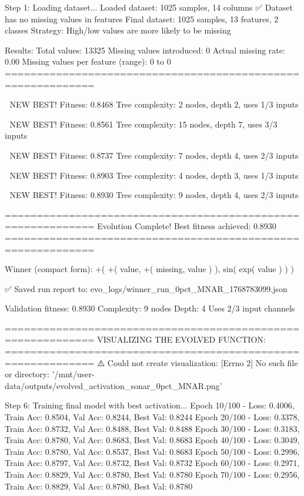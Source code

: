 Step 1: Loading dataset...
Loaded dataset: 1025 samples, 14 columns
✅ Dataset has no missing values in features
Final dataset: 1025 samples, 13 features, 2 classes
Strategy: High/low values are more likely to be missing

Results:
  Total values: 13325
  Missing values introduced: 0
  Actual missing rate: 0.00%
  Missing values per feature (range): 0 to 0
============================================================


🎯 NEW BEST! Fitness: 0.8468
Tree complexity: 2 nodes, depth 2, uses 1/3 inputs

🎯 NEW BEST! Fitness: 0.8561
Tree complexity: 15 nodes, depth 7, uses 3/3 inputs

🎯 NEW BEST! Fitness: 0.8737
Tree complexity: 7 nodes, depth 4, uses 2/3 inputs

🎯 NEW BEST! Fitness: 0.8903
Tree complexity: 4 nodes, depth 3, uses 1/3 inputs

🎯 NEW BEST! Fitness: 0.8930
Tree complexity: 9 nodes, depth 4, uses 2/3 inputs

============================================================
Evolution Complete!
Best fitness achieved: 0.8930
============================================================

Winner (compact form):
 +(
  +(
    value,
    +(
      missing,
      value
    )
  ),
  sin(
    exp(
      value
    )
  )
)

✅ Saved run report to: evo_logs/winner_run_0pct_MNAR_1768783099.json

Validation fitness: 0.8930
Complexity: 9 nodes
Depth: 4
Uses 2/3 input channels

============================================================
VISUALIZING THE EVOLVED FUNCTION:
============================================================
⚠️ Could not create visualization: [Errno 2] No such file or directory: '/mnt/user-data/outputs/evolved_activation_sonar_0pct_MNAR.png'

Step 6: Training final model with best activation...
Epoch  10/100 - Loss: 0.4006, Train Acc: 0.8504, Val Acc: 0.8244, Best Val: 0.8244
Epoch  20/100 - Loss: 0.3378, Train Acc: 0.8732, Val Acc: 0.8488, Best Val: 0.8488
Epoch  30/100 - Loss: 0.3183, Train Acc: 0.8780, Val Acc: 0.8683, Best Val: 0.8683
Epoch  40/100 - Loss: 0.3049, Train Acc: 0.8780, Val Acc: 0.8537, Best Val: 0.8683
Epoch  50/100 - Loss: 0.2996, Train Acc: 0.8797, Val Acc: 0.8732, Best Val: 0.8732
Epoch  60/100 - Loss: 0.2971, Train Acc: 0.8829, Val Acc: 0.8780, Best Val: 0.8780
Epoch  70/100 - Loss: 0.2956, Train Acc: 0.8829, Val Acc: 0.8780, Best Val: 0.8780

